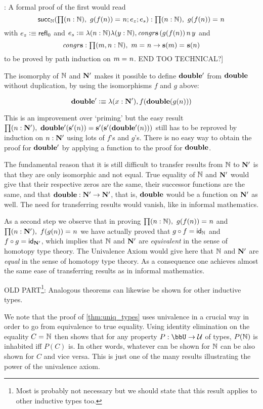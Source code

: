  : A formal proof of the first would read
\[\rec_\nat(\prd{n : \nat} \id{g(f(n))}{n};e_z;e_s)
: \prd{n : \nat} \id{g(f(n))}{n}
\] 
with  $e_z \defeq \refl{\z}$ and
$e_s \defeq \lambda(n: \nat)\lambda(y: \nat),\mathit{congr\s}\,(g(f(n))\, n\,y$ 
and
\[\mathit{congr\s} : \prd{m,n : \nat} \id{m}{n} \to\id{\s(m)}{\s(n)}\]
to be proved by path induction on $\id{m}{n}$.
END TOO TECHNICAL?]

The isomorphy of $\nat$ and $\natp$ makes it possible to define $\dblp$ from $\dbl$
without duplication, by using the isomorphisms $f$ and $g$ above:

\[ \dblp \defeq \lambda(x :\natp), f(\dbl(g(n))) \]

This is an improvement over `priming' but the easy result
$\prd{n : \natp} \dblp(\Sp(n))=\Sp(\Sp(\dblp(n)))$ still has to be reproved
by induction on $n:\natp$ using lots of $f$'s and $g$'s.
There is no easy way to obtain the proof for $\dblp$
by applying a function to the proof for $\dbl$.

The fundamental reason that it is still difficult to transfer results
from $\nat$ to $\natp$ is that they are only isomorphic and
not equal. True equality of $\nat$ and $\natp$ would give that their respective zeros are the same, their successor functions are the same, and that $\dbl:\natp\to\natp$, that is, $\dbl$ would be a function on $\natp$ as well. 
The need for transferring results would vanish, like in informal mathematics.

As a second step we observe that in proving $\prd{n : \nat} \id{g(f(n))}{n}$ 
and $\prd{n : \natp} \id{f(g(n))}{n}$ we have actually proved that
$g\circ{}f = \idfunc[\nat]$ and $f\circ{}g = \idfunc[\natp]$,
which implies that $\nat$ and $\natp$ are \emph{equivalent} 
in the sense of homotopy type theory.
The Univalence Axiom would give here that $\nat$ and $\natp$ are \emph{equal}
in the sense of homotopy type theory.
As a consequence one achieves almost the same ease of transferring results
as in informal mathematics.

OLD PART\footnote{Most is probably not necessary but we should state that this result applies to other inductive types too.}: Analogous theorems can likewise be shown for other inductive types.

We note that the proof of \ref{thm:uniq_types} uses univalence in a crucial way in order to go from equivalence to true equality. Using identity elimination on the equality $\id{C}{\nat}$ then shows that for any property $P : \bbU \to \type$ of types, $P(\nat)$ is inhabited iff $P(C)$ is. In other words, whatever can be shown for $\nat$ can be also shown for $C$ and vice versa. This is just one of the many results illustrating the power of the univalence axiom.

